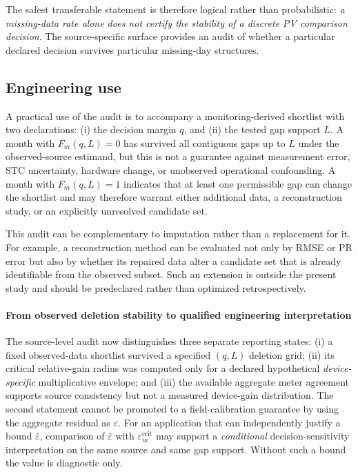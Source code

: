 \documentclass[preprint,12pt]{elsarticle}
\begin{document}
The safest transferable statement is therefore logical rather than probabilistic: \emph{a missing-data rate alone does not certify the stability of a discrete PV comparison decision}. The source-specific surface provides an audit of whether a particular declared decision survives particular missing-day structures.

\subsection{Engineering use}
A practical use of the audit is to accompany a monitoring-derived shortlist with two declarations: (i) the decision margin $q$, and (ii) the tested gap support $L$. A month with $F_m(q,L)=0$ has survived all contiguous gaps up to $L$ under the observed-source estimand, but this is not a guarantee against measurement error, STC uncertainty, hardware change, or unobserved operational confounding. A month with $F_m(q,L)=1$ indicates that at least one permissible gap can change the shortlist and may therefore warrant either additional data, a reconstruction study, or an explicitly unresolved candidate set.

This audit can be complementary to imputation rather than a replacement for it. For example, a reconstruction method can be evaluated not only by RMSE or PR error but also by whether its repaired data alter a candidate set that is already identifiable from the observed subset. Such an extension is outside the present study and should be predeclared rather than optimized retrospectively.

\paragraph{From observed deletion stability to qualified engineering interpretation}
The source-level audit now distinguishes three separate reporting states: (i) a fixed observed-data shortlist survived a specified $(q,L)$ deletion grid; (ii) its critical relative-gain radius was computed only for a declared hypothetical \emph{device-specific} multiplicative envelope; and (iii) the available aggregate meter agreement supports source consistency but not a measured device-gain distribution. The second statement cannot be promoted to a field-calibration guarantee by using the aggregate residual as $\varepsilon$. For an application that can independently justify a bound $\bar\varepsilon$, comparison of $\bar\varepsilon$ with $\varepsilon_m^{\mathrm{crit}}$ may support a \emph{conditional} decision-sensitivity interpretation on the same source and same gap support. Without such a bound the value is diagnostic only.
\end{document}
